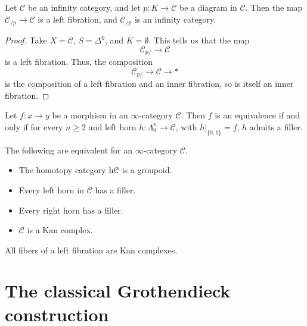 \documentclass[main.tex]{subfiles}
\begin{document}
\begin{corollary}
  Let $\mathcal{C}$ be an infinity category, and let $p\colon K \to \mathcal{C}$ be a diagram in $\mathcal{C}$. Then the map $\mathcal{C}_{/p} \to \mathcal{C}$ is a left fibration, and $\mathcal{C}_{/p}$ is an infinity category.
\end{corollary}
\begin{proof}
  Take $X = \mathcal{C}$, $S = \Delta^{0}$, and $\bar{K} = \emptyset$. This tells us that the map
  \begin{equation*}
    \mathcal{C}_{p/} \to \mathcal{C}
  \end{equation*}
  is a left fibration. Thus, the composition
  \begin{equation*}
    \mathcal{C}_{p/} \to \mathcal{C} \to *
  \end{equation*}
  is the composition of a left fibration and an inner fibration, so is itself an inner fibration.
\end{proof}

\begin{corollary}
  Let $f\colon x \to y$ be a morphism in an $\infty$-category $\mathcal{C}$. Then $f$ is an equivalence if and only if for every $n \geq 2$ and left horn $h\colon \Lambda^{n}_{0} \to \mathcal{C}$, with $h|_{\{0, 1\}} = f$, $h$ admits a filler.
\end{corollary}

\begin{theorem}
  The following are equivalent for an $\infty$-category $\mathcal{C}$.
  \begin{itemize}
    \item The homotopy category $\mathrm{h}\mathcal{C}$ is a groupoid.

    \item Every left horn in $\mathcal{C}$ has a filler.

    \item Every right horn has a filler.

    \item $\mathcal{C}$ is a Kan complex.
  \end{itemize}
\end{theorem}

\begin{corollary}
  \label{cor:fibers_of_left_fibration_are_kan_complexes}
  All fibers of a left fibration are Kan complexes.
\end{corollary}

\section{The classical Grothendieck construction}
\label{sec:the_classical_grothendieck_construction}
\end{document}
